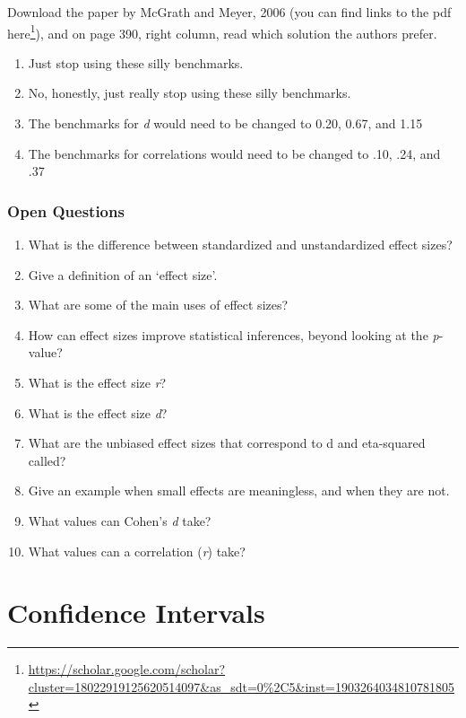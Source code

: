 \documentclass[
  oneside]{krantz}
\providecommand{\tightlist}{%
  \setlength{\itemsep}{0pt}\setlength{\parskip}{0pt}}
\renewcommand{\href}[2]{#2\footnote{\url{#1}}}
\begin{document}
Download the paper by McGrath and Meyer, 2006 (you can find links to the pdf \href{https://scholar.google.com/scholar?cluster=18022919125620514097\&as_sdt=0\%2C5\&inst=1903264034810781805}{here}), and on page 390, right column, read which solution the authors prefer.

\begin{enumerate}
\def\labelenumi{\Alph{enumi})}
\tightlist
\item
  Just stop using these silly benchmarks.
\item
  No, honestly, just really stop using these silly benchmarks.
\item
  The benchmarks for \emph{d} would need to be changed to 0.20, 0.67, and 1.15
\item
  The benchmarks for correlations would need to be changed to .10, .24, and .37
\end{enumerate}

\hypertarget{open-questions-4}{%
\subsection{Open Questions}\label{open-questions-4}}

\begin{enumerate}
\def\labelenumi{\arabic{enumi}.}
\item
  What is the difference between standardized and unstandardized effect sizes?
\item
  Give a definition of an `effect size'.
\item
  What are some of the main uses of effect sizes?
\item
  How can effect sizes improve statistical inferences, beyond looking at the \emph{p}-value?
\item
  What is the effect size \emph{r}?
\item
  What is the effect size \emph{d}?
\item
  What are the unbiased effect sizes that correspond to d and eta-squared called?
\item
  Give an example when small effects are meaningless, and when they are not.
\item
  What values can Cohen's \emph{d} take?
\item
  What values can a correlation (\emph{r}) take?
\end{enumerate}

\hypertarget{confint}{%
\chapter{Confidence Intervals}\label{confint}}
\end{document}

